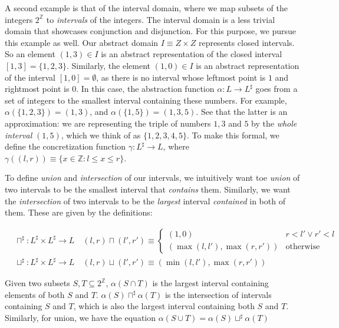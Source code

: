 \documentclass[11pt]{book}
\newcommand{\Z}{\ensuremath{\mathbb Z}}
\begin{document}
A second example is that of the interval domain, where we map subsets of the
integers $2^\Z$ to \emph{intervals} of the integers. The interval domain is a
less trivial domain that showcases conjunction and disjunction. For this
purpose, we pursue this example as well.  Our abstract domain $I \equiv Z
\times Z$ represents closed intervals. So an element $(1, 3) \in I$ is an
abstract representation of the closed interval $[1, 3] = \{ 1, 2, 3 \}$.  Similarly,
the element $(1, 0) \in I$ is an abstract representation of the interval $[1, 0] = \emptyset$,
as there is no interval whose leftmost point is $1$ and rightmost point is $0$.
In this case, the abstraction function $\alpha: L \rightarrow L^\sharp$ goes
from a set of integers to the smallest interval containing these numbers. For
example, $\alpha(\{1, 2, 3\}) = (1, 3)$, and $\alpha(\{1, 5\}) = (1, 3, 5)$.
See that the latter is an approximation: we are representing the triple of
numbers $1, 3$ and $5$ by the \emph{whole interval} $(1, 5)$, which we think of
as $\{1, 2, 3, 4, 5\}$. To make this formal, we define the concretization
function $\gamma: L^\sharp \rightarrow L$, where $\gamma((l, r)) \equiv \{ x
\in \mathbb Z : l \leq x \leq r \}$.


To define \emph{union} and \emph{intersection} of our intervals, we intuitively
want toe \emph{union} of two intervals to be the smallest interval that \emph{contains} them.
Similarly, we want the \emph{intersection} of two intervals to be the \emph{largest} interval
\emph{contained} in both of them. These are given by the definitions:

\begin{align*}
    &\sqcap^\sharp: L^\sharp \times L^\sharp \rightarrow L \quad (l, r) \sqcap (l', r') \equiv
    \begin{cases}
        (1, 0) & r < l' \lor r' < l \\
        (\max (l, l'), \max (r, r')) & \text{otherwise}
    \end{cases} \\
    &\sqcup^\sharp: L^\sharp \times L^\sharp \rightarrow L \quad (l, r) \sqcup (l', r') \equiv (\min(l, l'), \max(r, r'))
\end{align*}

Given two subsets $S, T \subseteq 2^\Z$, $\alpha(S \cap T)$ is the largest interval
containing elements of both $S$ and $T$. $\alpha(S) \sqcap^\sharp \alpha(T)$ is the
intersection of intervals containing $S$ and $T$, which is also the largest interval
containing both $S$ and $T$. Similarly, for union, we have the equation
$\alpha(S \cup T) = \alpha(S) \sqcup^\sharp \alpha(T)$
\end{document}
